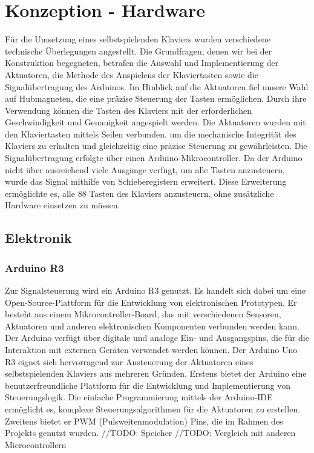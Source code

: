 \chapter{Konzeption - Hardware}\label{Hardware - Konzeption}

\nocite{*}

Für die Umsetzung eines selbstspielenden Klaviers wurden verschiedene technische Überlegungen angestellt.
Die Grundfragen, denen wir bei der Konstruktion begegneten, betrafen die Auswahl und Implementierung der
Aktuatoren, die Methode des Anspielens der Klaviertasten sowie die Signalübertragung des Arduinos.
Im Hinblick auf die Aktuatoren fiel unsere Wahl auf Hubmagneten, die eine präzise Steuerung der Tasten
ermöglichen. Durch ihre Verwendung können die Tasten des Klaviers mit der erforderlichen Geschwindigkeit und
Genauigkeit angespielt werden. \newline
Die Aktuatoren wurden mit den Klaviertasten mittels Seilen verbunden, um die mechanische Integrität des Klaviers
zu erhalten und gleichzeitig eine präzise Steuerung zu gewährleisten.\newline
Die Signalübertragung erfolgte über einen Arduino-Mikrocontroller. Da der Arduino nicht über ausreichend
viele Ausgänge verfügt, um alle Tasten anzusteuern, wurde das Signal mithilfe von Schieberegistern erweitert.
Diese Erweiterung ermöglichte es, alle 88 Tasten des Klaviers anzusteuern, ohne zusätzliche Hardware einsetzen
zu müssen.

\section{Elektronik}\label{Vorgehen - Hardware}


\subsection{Arduino R3}\label{Ansteuerung}
Zur Signalsteuerung wird ein Arduino R3 genutzt.
Es handelt sich dabei um eine Open-Source-Plattform für die Entwicklung von elektronischen Prototypen. Er besteht aus
einem Mikrocontroller-Board, das mit verschiedenen Sensoren, Aktuatoren und anderen elektronischen Komponenten
verbunden werden kann. Der Arduino verfügt über digitale und analoge Ein- und Ausgangspins, die für die Interaktion mit
externen Geräten verwendet werden können. \newline
Der Arduino Uno R3 eignet sich hervorragend zur Ansteuerung der Aktuatoren eines selbstspielenden Klaviers aus
mehreren Gründen. Erstens bietet der Arduino eine benutzerfreundliche Plattform für die Entwicklung und Implementierung
von Steuerungslogik. Die einfache Programmierung mittels der Arduino-IDE ermöglicht es, komplexe Steuerungsalgorithmen
für die Aktuatoren zu erstellen. \newline
Zweitens bietet er PWM (Pulsweitenmodulation) Pins, die im Rahmen des Projekts genutzt wurden.
//TODO: Speicher \newline
//TODO: Vergleich mit anderen Microcontrollern

